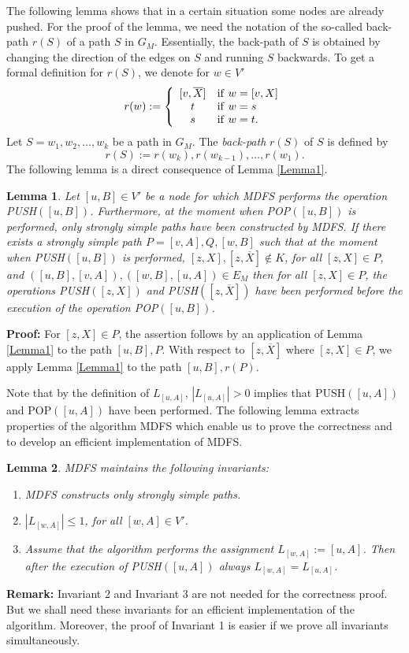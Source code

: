 \documentclass[12pt,twoside,a4paper]{article}
\def\QED{\hbox{\hskip 1pt \vrule width4pt height 6pt depth 1.5pt \hskip 1pt}}
\newtheorem{lemma}{Lemma}
\begin{document}
\medskip
The following lemma shows that in a certain situation some nodes are 
already pushed.
For the proof of the lemma, we need the notation of the so-called 
back-path $r(S)$ of a path $S$ in $G_M$. Essentially, the back-path of $S$ is
obtained by changing the direction of the edges on $S$ and running $S$ backwards. 
To get a formal definition for $r(S)$, we denote for $w \in V'$
$$ r(w) :=
\left\{\begin{array}{cl}
[v,\overline{X}] & {\rm if\ } w=[v,X] \\
t                & {\rm if\ } w=s \\
s                & {\rm if\ } w=t.
\end{array}\right.
$$
Let $S = w_1,w_2,\ldots,w_k$ be a path in $G_M$. The {\em back-path\/}
$r(S)$ of $S$ is defined by
$$ r(S) := r(w_k), r(w_{k-1}), \ldots,r(w_1).$$
The following lemma is a direct consequence of Lemma \ref{Lemma1}.
\begin{lemma} \label{Lemma3}
Let $[u,B]\in V'$ be a node for which MDFS performs the operation
PUSH$([u,B])$. 
Furthermore, at the moment when POP$([u,B])$ is performed, only strongly simple 
paths have been constructed by MDFS. If there exists a strongly simple path
$P=[v,A],Q,[w,B]$ such that at the moment when PUSH$([u,B])$ is performed,  
$[z,X],[z,\overline{X}] \not\in K$, for all $[z,X] \in P$, and 
$([u,B],[v,A]), ([w,B],[u,A]) \in E_M$ then for all $[z,X] \in P$, the 
operations PUSH$([z,X])$ and PUSH$([z,\overline{X}])$ have been performed 
before the execution of the operation POP$([u,B])$.
\end{lemma}
{\bf Proof:} 
For $[z,X] \in P$, the assertion follows by an application of Lemma \ref{Lemma1}
to the path $[u,B],P$. With respect to $[z,\overline{X}]$ where $[z,X] \in P$, 
we apply Lemma \ref{Lemma1} to the path $[u,B],r(P)$.
\QED

\medskip
Note that by the definition of $L_{[u,A]}$, $|L_{[u,A]}| > 0$ implies that PUSH$([u,A])$ 
and POP$([u,A])$ have been performed. The following lemma extracts properties of
the algorithm MDFS which enable us to prove the correctness and to develop an efficient 
implementation of MDFS.

\begin{lemma} \label{Lemma4}
MDFS maintains the following invariants:
\vspace{-0.2cm}
\begin{enumerate}
\item 
MDFS constructs only strongly simple paths.
\item 
$|L_{[w,A]}| \leq 1$, for all $[w,A] \in V'$.
\item
Assume that the algorithm performs the assignment $L_{[w,A]} := [u,A]$. 
Then after the execution of PUSH$([u,A])$ always $L_{[w,A]} = L_{[u,A]}$. 
\end{enumerate}
\end{lemma}
{\bf Remark:} Invariant 2 and Invariant 3 are not needed for the correctness
proof. But we shall need these invariants for an efficient 
implementation of the algorithm. Moreover, the proof of Invariant 1 is easier 
if we prove all invariants simultaneously.
\end{document}
